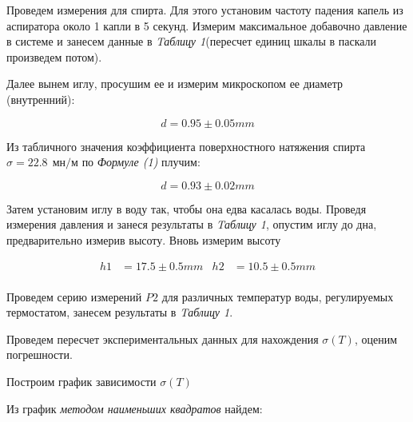 \begin{center}
\end{center}

Проведем измерения для спирта. Для этого установим частоту падения капель из аспиратора около 1 капли в 5 секунд. Измерим максимальное добавочно давление в системе и занесем данные в \textit{Tаблицу 1}(пересчет единиц шкалы в паскали произведем потом).

\bigskip

Далее вынем иглу, просушим ее и измерим микроскопом ее диаметр (внутренний):

\begin{equation*}
d = 0.95 \pm 0.05 mm
\end{equation*}

Из табличного значения коэффициента поверхностного натяжения спирта $\sigma = 22.8 \: \: мн/м$ по \textit{Формуле (1)} плучим:

\begin{equation*}
d = 0.93\pm 0.02 mm
\end{equation*}

\bigskip

Затем установим иглу в воду так, чтобы она едва касалась воды. Проведя измерения давления и занеся результаты в \textit{Tаблицу 1}, опустим иглу до дна, предварительно измерив высоту. Вновь измерим высоту

\begin{align*}
 h1&=17.5 \pm 0.5 mm & h2&=10.5 \pm 0.5 mm\\
\end{align*} 

\bigskip

Проведем серию измерений $P2$ для различных температур воды, регулируемых термостатом, занесем результаты в \textit{Tаблицу 1}.

\bigskip

\begin{center}
\end{center}

\smallskip

Проведем пересчет экспериментальных данных для нахождения $\sigma(T)$, оценим погрешности.

\smallskip

Построим график зависимости $\sigma(T)$

\smallskip

Из график \textit{методом наименьших квадратов} найдем:


